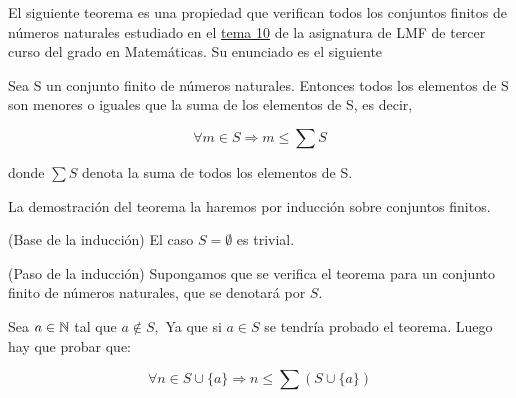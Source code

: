 %
\begin{isabellebody}%
%
%
\isadelimtheory
\isanewline
%
\endisadelimtheory
%
\isatagtheory
%
\endisatagtheory
{\isafoldtheory}%
%
\isadelimtheory
%
\endisadelimtheory
%
\begin{isamarkuptext}%
%
\end{isamarkuptext}\isamarkuptrue%
%
\begin{isamarkuptext}%
%
\end{isamarkuptext}\isamarkuptrue%
%
\begin{isamarkuptext}%
%
\end{isamarkuptext}\isamarkuptrue%
%
\isadelimdocument
%
\endisadelimdocument
%
\isatagdocument
%
\isamarkuptrue%
%
\endisatagdocument
{\isafolddocument}%
%
\isadelimdocument
%
\endisadelimdocument
%
\begin{isamarkuptext}%
El siguiente teorema es una propiedad que verifican todos los 
conjuntos finitos de números naturales  estudiado en el 
\href{http://bit.ly/2XBW6n2}{tema 10} de la
asignatura de LMF de tercer curso del grado en Matemáticas. Su enunciado
 es el siguiente 

  \begin{teorema} 
    Sea S un conjunto finito de números naturales.  Entonces todos los
 elementos de S son menores o iguales que la suma de los elementos de
 S, es decir,

 $$\forall m \in S \Longrightarrow m \leq \sum S$$ 

donde $\sum S $ denota la suma de todos los elementos de S.
  \end{teorema} 

\begin{demostracion}
La demostración del teorema la haremos por inducción sobre conjuntos
 finitos.

  
 (Base de la inducción) El caso $S = \emptyset$ es trivial.

 (Paso de la inducción) Supongamos que se verifica el teorema para un
 conjunto finito de números naturales, que se denotará por $S.$ 
 
Sea $a \in \Bbb{N}$ tal que $a \notin S,$ Ya que si $a \in S$ se tendría
probado el teorema. Luego hay que probar que: 

$$\forall n \in S \cup \{a\} \Longrightarrow n \leq \sum (S \cup
 \{a\})$$


\end{demostracion}
\end{isamarkuptext}
\end{isabellebody}
